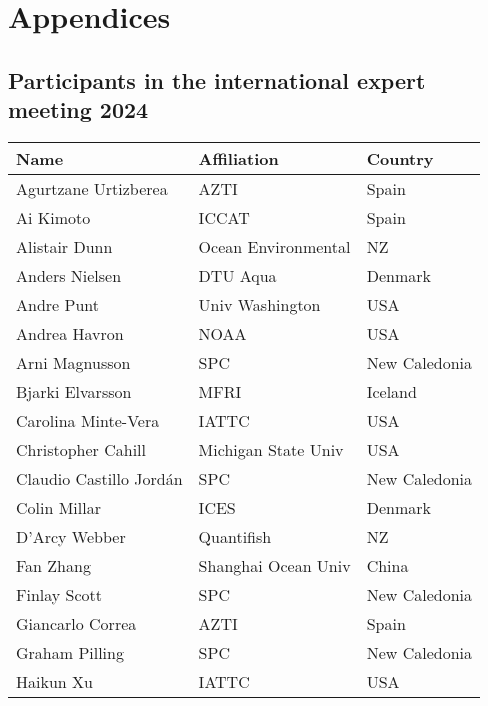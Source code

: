 \documentclass{SCreport}
\newcommand\I[1]{\rule{0pt}{#1}}
\begin{document}
\appendix

\section{Appendices}

\subsection{Participants in the international expert meeting 2024}
\label{sec:meeting-participants}

\vspace{2ex}

\begin{tabular}{lll}
  \hline
  Name                    & Affiliation          & Country\\
  \hline
  Agurtzane Urtizberea    & AZTI                 & Spain\I{2.6ex}\\
  Ai Kimoto               & ICCAT                & Spain\\
  Alistair Dunn           & Ocean Environmental  & NZ\\
  Anders Nielsen          & DTU Aqua             & Denmark\\
  Andre Punt              & Univ Washington      & USA\\
  Andrea Havron           & NOAA                 & USA\\
  Arni Magnusson          & SPC                  & New Caledonia\\
  Bjarki Elvarsson        & MFRI                 & Iceland\\
  Carolina Minte-Vera     & IATTC                & USA\\
  Christopher Cahill      & Michigan State Univ  & USA\\
  Claudio Castillo Jordán & SPC                  & New Caledonia\\
  Colin Millar            & ICES                 & Denmark\\
  D'Arcy Webber           & Quantifish           & NZ\\
  Fan Zhang               & Shanghai Ocean Univ  & China\\
  Finlay Scott            & SPC                  & New Caledonia\\
  Giancarlo Correa        & AZTI                 & Spain\\
  Graham Pilling          & SPC                  & New Caledonia\\
  Haikun Xu               & IATTC                & USA\\

\end{tabular}
\end{document}
